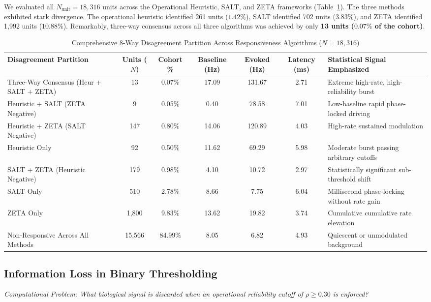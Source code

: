 \documentclass[10pt,journal,compsoc]{IEEEtran}
\begin{document}
We evaluated all $N_{\text{unit}} = 18,316$ units across the Operational Heuristic, SALT, and ZETA frameworks (Table~\ref{tab:responsiveness}). The three methods exhibited stark divergence. The operational heuristic identified 261 units ($1.42\%$), SALT identified 702 units ($3.83\%$), and ZETA identified 1,992 units ($10.88\%$). Remarkably, three-way consensus across all three algorithms was achieved by only \textbf{13 units ($0.07\%$ of the cohort)}.

\begin{table}[t]
\caption{Comprehensive 8-Way Disagreement Partition Across Responsiveness Algorithms ($N=18,316$)}
\label{tab:responsiveness}
\centering
\begin{tabularx}{\textwidth}{lcccccX}
\toprule
\textbf{Disagreement Partition} & \textbf{Units ($N$)} & \textbf{Cohort \%} & \textbf{Baseline (Hz)} & \textbf{Evoked (Hz)} & \textbf{Latency (ms)} & \textbf{Statistical Signal Emphasized} \\
\midrule
Three-Way Consensus (Heur + SALT + ZETA) & 13 & 0.07\% & 17.09 & 131.67 & 2.71 & Extreme high-rate, high-reliability burst \\
Heuristic + SALT (ZETA Negative)         & 9 & 0.05\% & 0.40 & 78.58 & 7.01 & Low-baseline rapid phase-locked driving \\
Heuristic + ZETA (SALT Negative)         & 147 & 0.80\% & 14.06 & 120.89 & 4.03 & High-rate sustained modulation \\
Heuristic Only                           & 92 & 0.50\% & 11.62 & 69.29 & 5.98 & Moderate burst passing arbitrary cutoffs \\
SALT + ZETA (Heuristic Negative)         & 179 & 0.98\% & 4.10 & 10.72 & 2.97 & Statistically significant sub-threshold shift \\
SALT Only                                & 510 & 2.78\% & 8.66 & 7.75 & 6.04 & Millisecond phase-locking without rate gain \\
ZETA Only                                & 1,800 & 9.83\% & 13.62 & 19.82 & 3.74 & Cumulative cumulative rate elevation \\
Non-Responsive Across All Methods        & 15,566 & 84.99\% & 8.05 & 6.82 & 4.93 & Quiescent or unmodulated background \\
\bottomrule
\end{tabularx}
\end{table}

\subsection{Information Loss in Binary Thresholding}
\textit{Computational Problem: What biological signal is discarded when an operational reliability cutoff of $\rho \ge 0.30$ is enforced?}
\end{document}
